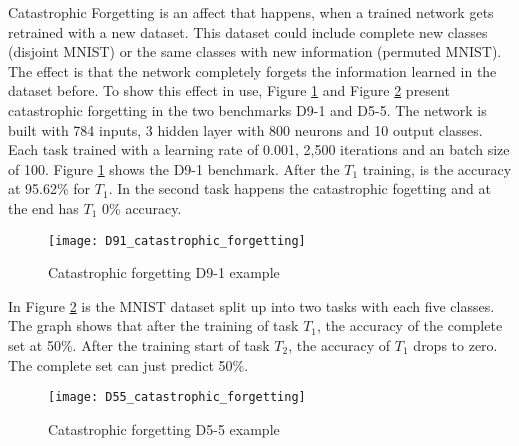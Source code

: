 Catastrophic Forgetting is an affect that happens, when a trained network gets retrained with a new dataset.
This dataset could include complete new classes (disjoint MNIST) or the same classes with new information (permuted MNIST).
The effect is that the network completely forgets the information learned in the dataset before.
\newline
To show this effect in use, Figure \ref{fig:catastrophic_forgetting_d91_example} and Figure \ref{fig:catastrophic_forgetting_d55_example} present catastrophic forgetting in the two benchmarks D9-1 and D5-5.
\newline
The network is built with 784 inputs, 3 hidden layer with 800 neurons and 10 output classes.
Each task trained with a learning rate of 0.001, 2,500 iterations and an batch size of 100.
\newline
Figure \ref{fig:catastrophic_forgetting_d91_example} shows the D9-1 benchmark. After the $T_1$ training, is the accuracy at 95.62\% for $T_1$. In the second task happens the catastrophic fogetting and at the end has $T_1$ 0\% accuracy.

\begin{figure}[H]
    \centering
    \texttt{[image: D91\_catastrophic\_forgetting]}
    \caption{Catastrophic forgetting D9-1 example}
    \label{fig:catastrophic_forgetting_d91_example}
\end{figure}

\newpage

In Figure \ref{fig:catastrophic_forgetting_d55_example} is the MNIST dataset split up into two tasks with each five classes.
The graph shows that after the training of task $T_1$, the accuracy of the complete set at 50\%.
After the training start of task $T_2$, the accuracy of $T_1$ drops to zero.
The complete set can just predict 50\%.

\begin{figure}[H]
    \centering
    \texttt{[image: D55\_catastrophic\_forgetting]}
    \caption{Catastrophic forgetting D5-5 example}
    \label{fig:catastrophic_forgetting_d55_example}
\end{figure}

